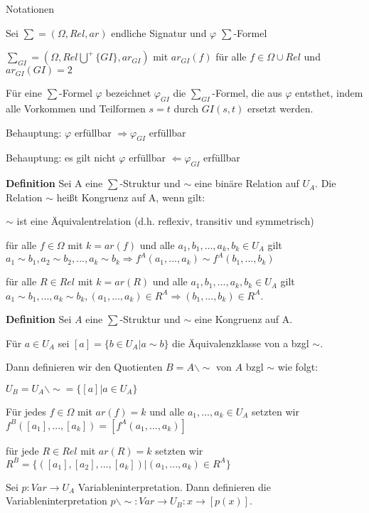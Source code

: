 \documentclass[a4paper]{article}
\renewcommand{\note}[2]{\begin{noteBox} \textbf{#1} #2 \end{noteBox}}
\begin{document}
\begin{multicols}{3}
  Notationen
  \begin{itemize*}
    \item Sei $\sum=(\Omega,Rel,ar)$ endliche Signatur und $\varphi$ $\sum$-Formel
    \item $\sum_{GI} = (\Omega, Rel\bigcup^+\{GI\},ar_{GI})$ mit $ar_{GI}(f)$ für alle $f\in\Omega\cup Rel$ und $ar_{GI}(GI)=2$
    \item Für eine $\sum$-Formel $\varphi$ bezeichnet $\varphi_{GI}$ die $\sum_{GI}$-Formel, die aus $\varphi$ entsthet, indem alle Vorkommen und Teilformen $s=t$ durch $GI(s,t)$ ersetzt werden.
  \end{itemize*}

  Behauptung: $\varphi$ erfüllbar $\Rightarrow \varphi_{GI}$ erfüllbar

  Behauptung: es gilt nicht $\varphi$ erfüllbar $\Leftarrow\varphi_{GI}$ erfüllbar

  \note{Definition}{Sei A eine $\sum$-Struktur und $\sim$ eine binäre Relation auf $U_A$. Die Relation $\sim$ heißt Kongruenz auf A, wenn gilt:
    \begin{itemize*}
      \item $\sim$ ist eine Äquivalentrelation (d.h. reflexiv, transitiv und symmetrisch)
      \item für alle $f\in\Omega$ mit $k=ar(f)$ und alle $a_1,b_1,...,a_k,b_k\in U_A$ gilt $a_1\sim b_1,a_2\sim b_2,...,a_k\sim b_k\Rightarrow f^A(a_1,...,a_k)\sim f^A(b_1,...,b_k)$
      \item für alle $R\in Rel$ mit $k=ar(R)$ und alle $a_1,b_1,...,a_k,b_k\in U_A$ gilt $a_1\sim b_1,...,a_k\sim b_k,(a_1,...,a_k)\in R^A\Rightarrow (b_1,...,b_k)\in R^A$.
    \end{itemize*}
  }

  \note{Definition}{Sei $A$ eine $\sum$-Struktur und $\sim$ eine Kongruenz auf A.
    \begin{enumerate*}
      \item Für $a\in U_A$ sei $[a]=\{b\in U_A|a\sim b\}$ die Äquivalenzklasse von a bzgl $\sim$.
      \item Dann definieren wir den Quotienten $B=A\backslash \sim$ von $A$ bzgl $\sim$ wie folgt:
      \begin{itemize*}
        \item $U_B=U_A\backslash\sim = \{[a]|a\in U_A\}$
        \item Für jedes $f\in\Omega$ mit $ar(f)=k$ und alle $a_1,...,a_k\in U_A$ setzten wir $f^B([a_1],...,[a_k])=[f^A(a_1,...,a_k)]$
        \item für jede $R\in Rel$ mit $ar(R)=k$ setzten wir $R^B=\{([a_1],[a_2],...,[a_k])|(a_1,...,a_k)\in R^A\}$
      \end{itemize*}
      \item Sei $p:Var\rightarrow U_A$ Variableninterpretation. Dann definieren die Variableninterpretation $p\backslash\sim: Var\rightarrow U_B:x\rightarrow[p(x)]$.
    \end{enumerate*}
  }


\end{multicols}
\end{document}
